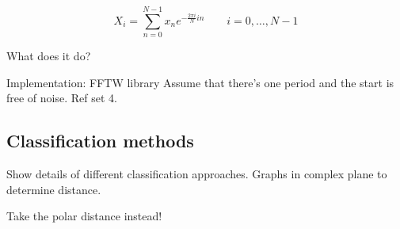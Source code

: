 \begin{equation}
	X_i = \sum_{n=0}^{N-1} x_n e^{-\frac{2 \pi i}{N} i n} \quad \quad i = 0, \dots, N-1
\end{equation}


What does it do?

Implementation: FFTW library \cite{FFTW}
Assume that there's one period and the start is free of noise.  Ref set 4.

\subsection{Classification methods}
Show details of different classification approaches.
Graphs in complex plane to determine distance.

Take the polar distance instead!
